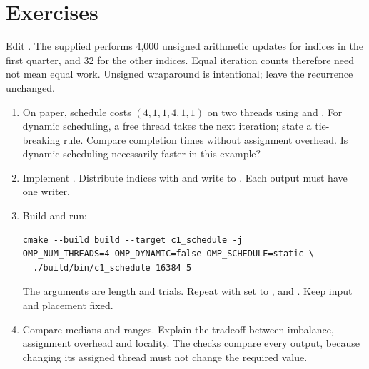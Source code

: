 \section{Exercises}
Edit . The supplied  performs 4,000
unsigned arithmetic updates for indices in the first quarter, and 32 for the
other indices. Equal iteration counts therefore need not mean equal work.
Unsigned wraparound is intentional; leave the recurrence unchanged.
\begin{enumerate}
\item On paper, schedule costs $(4,1,1,4,1,1)$ on two threads using
 and . For dynamic scheduling, a free thread takes
the next iteration; state a tie-breaking rule. Compare completion times without
assignment overhead. Is dynamic scheduling necessarily faster in this example?
\item Implement . Distribute indices with
 and write  to .
Each output must have one writer.
\item Build and run:
\begin{lstlisting}[style=shell]
cmake --build build --target c1_schedule -j
OMP_NUM_THREADS=4 OMP_DYNAMIC=false OMP_SCHEDULE=static \
  ./build/bin/c1_schedule 16384 5
\end{lstlisting}
The arguments are length and trials. Repeat with  set to
\code{static,1}, \code{dynamic,1} and \code{guided,8}. Keep input and placement fixed.
\item Compare medians and ranges. Explain the tradeoff between imbalance,
assignment overhead and locality. The checks compare every output, because
changing its assigned thread must not change the required value.
\end{enumerate}

